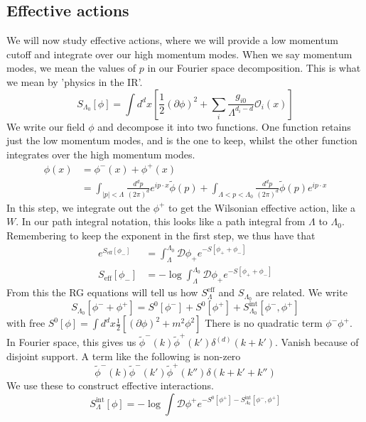 \documentclass[11pt, oneside]{article}   	%
\theoremstyle{slanted}
\begin{document}
\subsection{Effective actions}
We will now study effective 
actions, where 
we will provide a low momentum cutoff
and integrate over our high momentum modes. 
When we say momentum modes, we 
mean the values of $ p $ in our 
Fourier space decomposition. 
This is what we mean by 'physics in the IR'. 
\[
S_{ \Lambda _ 0 } \left[  \phi  \right]   = \int d ^ d x 
\left[  \frac{1}{2 } \left( \partial  \phi  \right)^ 2 + \sum _{ i } 
\frac{g _{ i 0  } }{ \Lambda ^{ d_ i - d  } } \mathcal{ O }_{ i } \left(  x  \right) \right] 
\] We write our 
field $ \phi $ and decompose it 
into two functions. One function retains 
just the low momentum modes, and is the one to keep, 
whilst the other function 
integrates over the high momentum modes. 
\begin{align*}
\phi (x )  &=  \phi ^{ - } \left( x  \right)  + \phi ^ + \left(  x  \right)   \\ 
&=  \int_{ | p | < \Lambda } \frac{d ^ d p }{ 
\left(  2 \pi  \right)  ^{ d } } e ^{ i p \cdot  x } 
\tilde{ \phi } \left( p  \right)   + \int _{ \Lambda < p < \Lambda _ 0    } \frac{d ^ d p }{ 
\left( 2 \pi  \right)  ^{ d } } \tilde{\phi } \left( p  \right)  
e ^{ i p \cdot  x }
\end{align*}
In this step, we integrate 
out the $ \phi ^ + $ to get the Wilsonian effective 
action, like a $ W $. In our 
path integral notation, this looks like 
a path integral from $ \Lambda $ to $ \Lambda _ 0 $. 
Remembering to keep the exponent in the first step, we 
thus have that
\begin{align*}
e ^{ S_{\text{eff}}\left[ \phi _ -  \right]  } &=  
\int _{ \Lambda } ^{ \Lambda _ 0 } \mathcal{ D } \phi _ + e ^{ 
- S \left[  \phi _ + + \phi _ -  \right]  } \\
S_{\text{eff}} \left[  \phi _ -  \right]  &=  
- \log \int_{ \Lambda } ^{ \Lambda _ 0 } \mathcal{  D } \phi _ + 
e ^{ - S \left[  \phi _ + + \phi _ -  \right] }
\end{align*} 
From this 
the RG equations will tell us how 
$ S _{ \Lambda } ^{ \text{eff}}$ and $ S _{ \Lambda _ 0 } $ 
are related. 
We write 
\[
S _{ \Lambda _ 0 } \left[  \phi 
^ - + \phi ^ +  \right]  = S ^{ 0 } \left[  \phi ^ -  \right]  
+ S ^ 0 \left[  \phi ^ +  \right]  + 
S_{ \Lambda _ 0 } ^{\text{int}} \left[  \phi ^ - , \phi ^  + \right] 
\] with free $ S ^ 0 \left[  \phi  \right]  
= \int d ^ d x \frac{1}{2 } \left[  \left( \partial  \phi  \right)  ^ 2 
+ m ^ 2 \phi ^ 2 \right] $
There is no quadratic term $ \phi ^ - \phi ^ + $. 
In Fourier space, this gives 
us $ \tilde{ \phi } ^ - \left( k  \right)  \tilde{ \phi } ^ + 
\left(  k'  \right)  \delta ^{ \left(  d  \right)  } \left( 
k + k ' \right)  $. 
Vanish because of disjoint support. 
A term like the following is non-zero 
\[
\tilde{ \phi } ^ - \left( k  \right)  \tilde{ \phi } ^ - \left( k'  \right) 
\tilde{ \phi } ^ + \left( k ''  \right)  \delta 
\left(  k + k ' + k ''  \right) 
\] We use these to 
construct effective interactions. 
\[
S _{ \Lambda } ^{ \text{int}} \left[  \phi  \right]  
 = - \log \int \mathcal{ D } \phi ^ + e ^{  -  S^ 0 
 \left[  \phi ^ +  \right]   - S _{ \Lambda _ 0 } ^{ \text{int}} \left[  
\phi ^ - , \phi ^ + \right] }
\] 
\end{document}
